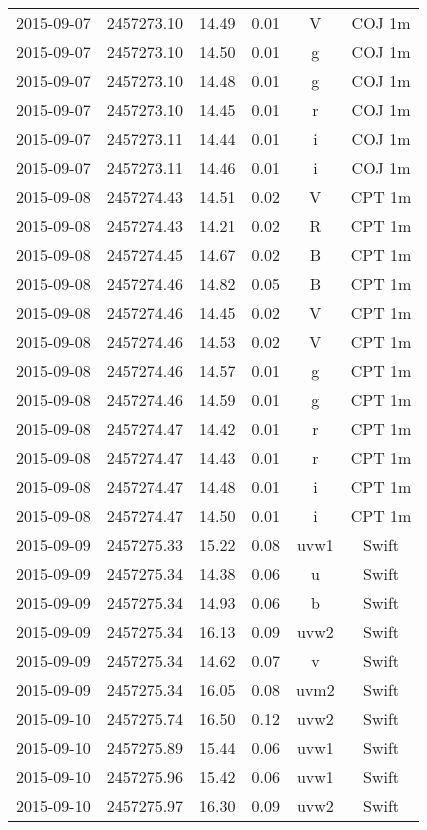 \begin{table}
\begin{tabular}{cccccc}
2015-09-07 & 2457273.10 & 14.49 & 0.01 & V & COJ 1m \\
2015-09-07 & 2457273.10 & 14.50 & 0.01 & g & COJ 1m \\
2015-09-07 & 2457273.10 & 14.48 & 0.01 & g & COJ 1m \\
2015-09-07 & 2457273.10 & 14.45 & 0.01 & r & COJ 1m \\
2015-09-07 & 2457273.11 & 14.44 & 0.01 & i & COJ 1m \\
2015-09-07 & 2457273.11 & 14.46 & 0.01 & i & COJ 1m \\
2015-09-08 & 2457274.43 & 14.51 & 0.02 & V & CPT 1m \\
2015-09-08 & 2457274.43 & 14.21 & 0.02 & R & CPT 1m \\
2015-09-08 & 2457274.45 & 14.67 & 0.02 & B & CPT 1m \\
2015-09-08 & 2457274.46 & 14.82 & 0.05 & B & CPT 1m \\
2015-09-08 & 2457274.46 & 14.45 & 0.02 & V & CPT 1m \\
2015-09-08 & 2457274.46 & 14.53 & 0.02 & V & CPT 1m \\
2015-09-08 & 2457274.46 & 14.57 & 0.01 & g & CPT 1m \\
2015-09-08 & 2457274.46 & 14.59 & 0.01 & g & CPT 1m \\
2015-09-08 & 2457274.47 & 14.42 & 0.01 & r & CPT 1m \\
2015-09-08 & 2457274.47 & 14.43 & 0.01 & r & CPT 1m \\
2015-09-08 & 2457274.47 & 14.48 & 0.01 & i & CPT 1m \\
2015-09-08 & 2457274.47 & 14.50 & 0.01 & i & CPT 1m \\
2015-09-09 & 2457275.33 & 15.22 & 0.08 & uvw1 & Swift \\
2015-09-09 & 2457275.34 & 14.38 & 0.06 & u & Swift \\
2015-09-09 & 2457275.34 & 14.93 & 0.06 & b & Swift \\
2015-09-09 & 2457275.34 & 16.13 & 0.09 & uvw2 & Swift \\
2015-09-09 & 2457275.34 & 14.62 & 0.07 & v & Swift \\
2015-09-09 & 2457275.34 & 16.05 & 0.08 & uvm2 & Swift \\
2015-09-10 & 2457275.74 & 16.50 & 0.12 & uvw2 & Swift \\
2015-09-10 & 2457275.89 & 15.44 & 0.06 & uvw1 & Swift \\
2015-09-10 & 2457275.96 & 15.42 & 0.06 & uvw1 & Swift \\
2015-09-10 & 2457275.97 & 16.30 & 0.09 & uvw2 & Swift \\

\end{tabular}
\end{table}
